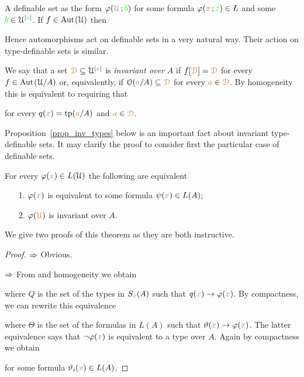 \documentclass[creche.tex]{subfiles}
\begin{document}
A definable set as the form $\varphi({\color{brown}\EuScript U}\,;{\color{green} b})$ for some formula $\varphi({\color{brown} x}\,;{\color{green} z})\in L$ and some ${\color{green} b}\in\EuScript U^{|{\color{green} z}|}$. If $f\in\textrm{Aut\kern.15ex}(\EuScript U)$ then 




Hence automorphisms act on definable sets in a very natural way. Their action on type-definable sets is similar.

We say that a set ${\color{brown}\EuScript D}\subseteq\EuScript U^{|{\color{brown} x}|}$ is \emph{invariant over $A$\/} if $f[{\color{brown}\EuScript D}]={\color{brown}\EuScript D}$ for every $f\in\textrm{Aut\kern.15ex}(\EuScript U/A)$ or, equivalently, if $\EuScript O({\color{brown} a}/A)\subseteq {\color{brown}\EuScript D}$ for every ${\color{brown} a}\in {\color{brown}\EuScript D}$.
By homogeneity this is equivalent to requiring that 


for every $q({\color{brown} x})={\rm tp}({\color{brown} a}/A)$ and ${\color{brown} a}\in {\color{brown}\EuScript D}$.

Proposition~\ref{prop_inv_types} below is an important fact about invariant type-definable sets. It may clarify the proof to consider first the particular case of definable sets.

\begin{proposition}\label{prop_inv_def}
For every $\varphi({\color{brown} x})\in L(\EuScript U)$ the following are equivalent
\begin{itemize}
 \item[1.] $\varphi({\color{brown} x})$ is equivalent to some formula $\psi({\color{brown} x})\in L(A)$;
 \item[2.] $\varphi({\color{brown}\EuScript U})$ is invariant over $A$.
\end{itemize}
\end{proposition}

We give two proofs of this theorem as they are both instructive. 

\begin{proof}
$\Rightarrow$ Obvious.

$\Rightarrow$ From  and homogeneity we obtain


where $Q$ is the set of the types in $S_{\color{brown} x}(A)$ such that $q({\color{brown} x})\rightarrow\varphi({\color{brown} x})$. 
By compactness, we can rewrite this equivalence 


where $\Theta$ is the set of the formulas in $L(A)$ such that $\vartheta({\color{brown} x})\rightarrow\varphi({\color{brown} x})$.
The latter equivalence says that $\neg\varphi({\color{brown} x})$ is equivalent to a type over $A$. 
Again by compactness we obtain 


for some formula $\vartheta_i({\color{brown} x})\in L(A)$.
\end{proof}
\end{document}

